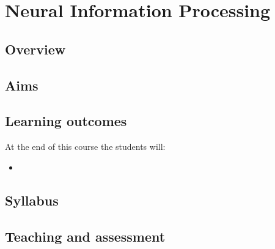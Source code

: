 \documentclass[12pt,a4paper]{scrartcl}
\begin{document}
\section*{Neural Information Processing}

\subsection*{Overview}

\subsection*{Aims}

\subsection*{Learning outcomes}

At the end of this course the students will:
\begin{itemize}
\item 
\end{itemize}

\subsection*{Syllabus}

\subsection*{Teaching and assessment}
\end{document}
